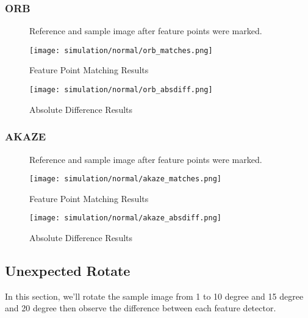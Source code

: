 		\subsubsection{ORB}
		\begin{figure}[H]
			\caption{Reference and sample image after feature points were marked.}
			\label{fig:siftFeaturePoints}
		\end{figure}
		\begin{figure}[H]
			\texttt{[image: simulation/normal/orb\_matches.png]}
			\caption{Feature Point Matching Results}
			\label{fig:sifeMatchingResult}
		\end{figure}
		\begin{figure}[H]
			\texttt{[image: simulation/normal/orb\_absdiff.png]}
			\caption{Absolute Difference Results}
			\label{fig:siftAbsDifference}
		\end{figure}

		\subsubsection{AKAZE}
		\begin{figure}[H]
			\caption{Reference and sample image after feature points were marked.}
			\label{fig:siftFeaturePoints}
		\end{figure}
		\begin{figure}[H]
			\texttt{[image: simulation/normal/akaze\_matches.png]}
			\caption{Feature Point Matching Results}
			\label{fig:sifeMatchingResult}
		\end{figure}
		\begin{figure}[H]
			\texttt{[image: simulation/normal/akaze\_absdiff.png]}
			\caption{Absolute Difference Results}
			\label{fig:siftAbsDifference}
		\end{figure}



	\subsection{Unexpected Rotate}
		In this section, we'll rotate the sample image from 1 to 10 degree and 15 degree and 20 degree then observe the difference between each feature detector.
